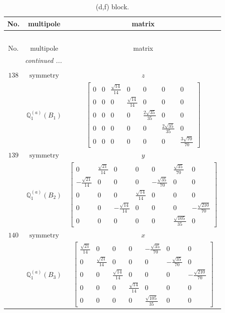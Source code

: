 \documentclass[fleqn,8pt,landscape]{jsarticle}
\begin{document}
\begin{longtable}{ccc}
\caption{(d,f) block.}
 \\
 \hline \hline
No. & multipole & matrix \\ \hline \endfirsthead

\multicolumn{2}{l}{\tablename\ \thetable{}} \\
 \hline \hline
No. & multipole & matrix \\ \hline \endhead

 \hline \hline
\multicolumn{2}{r}{\footnotesize\it continued ...} \\ \endfoot

 \hline \hline
\multicolumn{2}{r}{} \\ \endlastfoot

$ 138 $ & $ \text{symmetry} $ & $ z $ \\
$  $ & $ \mathbb{Q}_{1}^{(a)}(B_{1}) $ & $ \begin{bmatrix} 0 & 0 & \frac{\sqrt{14}}{14} & 0 & 0 & 0 & 0 \\ 0 & 0 & 0 & \frac{\sqrt{14}}{14} & 0 & 0 & 0 \\ 0 & 0 & 0 & 0 & \frac{2 \sqrt{35}}{35} & 0 & 0 \\ 0 & 0 & 0 & 0 & 0 & \frac{2 \sqrt{35}}{35} & 0 \\ 0 & 0 & 0 & 0 & 0 & 0 & \frac{3 \sqrt{70}}{70} \end{bmatrix} $ \\ \hline
$ 139 $ & $ \text{symmetry} $ & $ y $ \\
$  $ & $ \mathbb{Q}_{1}^{(a)}(B_{2}) $ & $ \begin{bmatrix} 0 & \frac{\sqrt{21}}{14} & 0 & 0 & 0 & \frac{\sqrt{35}}{70} & 0 \\ - \frac{\sqrt{21}}{14} & 0 & 0 & 0 & - \frac{\sqrt{35}}{70} & 0 & 0 \\ 0 & 0 & 0 & \frac{\sqrt{14}}{14} & 0 & 0 & 0 \\ 0 & 0 & - \frac{\sqrt{14}}{14} & 0 & 0 & 0 & - \frac{\sqrt{210}}{70} \\ 0 & 0 & 0 & 0 & 0 & \frac{\sqrt{105}}{35} & 0 \end{bmatrix} $ \\ \hline
$ 140 $ & $ \text{symmetry} $ & $ x $ \\
$  $ & $ \mathbb{Q}_{1}^{(a)}(B_{3}) $ & $ \begin{bmatrix} \frac{\sqrt{21}}{14} & 0 & 0 & 0 & - \frac{\sqrt{35}}{70} & 0 & 0 \\ 0 & \frac{\sqrt{21}}{14} & 0 & 0 & 0 & - \frac{\sqrt{35}}{70} & 0 \\ 0 & 0 & \frac{\sqrt{14}}{14} & 0 & 0 & 0 & - \frac{\sqrt{210}}{70} \\ 0 & 0 & 0 & \frac{\sqrt{14}}{14} & 0 & 0 & 0 \\ 0 & 0 & 0 & 0 & \frac{\sqrt{105}}{35} & 0 & 0 \end{bmatrix} $ \\ \hline

\end{longtable}
\end{document}
